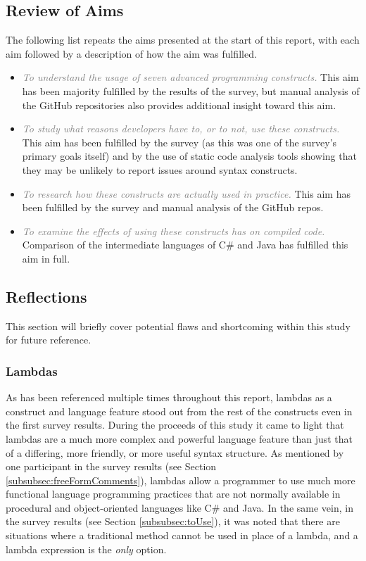 \documentclass{article}
\begin{document}
    \subsection{Review of Aims}
        The following list repeats the aims presented at the start of this report, with each aim followed by a description of how the aim was fulfilled.
        \begin{itemize}
            \item \textcolor{gray}{\textit{To understand the usage of seven advanced programming constructs.}}
                This aim has been majority fulfilled by the results of the survey, but manual analysis of the GitHub repositories also provides additional insight toward this aim.
            \item \textcolor{gray}{\textit{To study what reasons developers have to, or to not, use these constructs.}}
                This aim has been fulfilled by the survey (as this was one of the survey's primary goals itself) and by the use of static code analysis tools showing that they may be unlikely to report issues around syntax constructs.
            \item \textcolor{gray}{\textit{To research how these constructs are actually used in practice.}}
                This aim has been fulfilled by the survey and manual analysis of the GitHub repos.
            \item \textcolor{gray}{\textit{To examine the effects of using these constructs has on compiled code.}}
                Comparison of the intermediate languages of C\# and Java has fulfilled this aim in full.
        \end{itemize}
    \subsection{Reflections}
        This section will briefly cover potential flaws and shortcoming within this study for future reference.

        \subsubsection{Lambdas}
        \label{subsubsec:lambdas}
            As has been referenced multiple times throughout this report, lambdas as a construct and language feature stood out from the rest of the constructs even in the first survey results. During the proceeds of this study it came to light that lambdas are a much more complex and powerful language feature than just that of a differing, more friendly, or more useful syntax structure. As mentioned by one participant in the survey results (see Section \ref{subsubsec:freeFormComments}), lambdas allow a programmer to use much more functional language programming practices that are not normally available in procedural and object-oriented languages like C\# and Java. In the same vein, in the survey results (see Section \ref{subsubsec:toUse}), it was noted that there are situations where a traditional method cannot be used in place of a lambda, and a lambda expression is the \emph{only} option.
            
\end{document}
